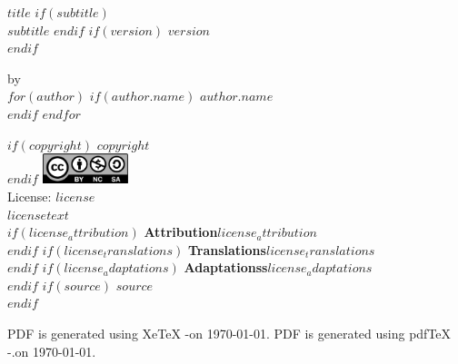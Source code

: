 \documentclass[10pt, letterpaper, titlepage, oneside, openright, final, article]{memoir}
\begin{document}
\frontmatter


%
%
\thispagestyle{empty}
\begin{flushleft}
    {\bfseries $title$}
    $if(subtitle)$
        {\\\itshape $subtitle$}
    $endif$
    $if(version)$
        \normalsize $version$\\
    $endif$
    \vspace*{1em}

    \normalsize by\\
    $for(author)$
        $if(author.name)$
            \normalsize $author.name$\\
        $endif$
    $endfor$

    \vspace*{1.5em}

    $if(copyright)$
        \normalsize $copyright$\\[1.2em]
    $endif$
    \includegraphics[keepaspectratio=true, width=2.5cm]{cc_by_nc_sa_40.eps}\\[1.2em]
    \normalsize License: $license$\\[1.2em]
    \normalsize $licensetext$\\[1.2em]
    $if(license_attribution)$
        \normalsize {\bfseries Attribution}\textemdash $license_attribution$\\[1.2em]
    $endif$
    $if(license_translations)$
        \normalsize {\bfseries Translations}\textemdash $license_translations$\\[1.2em]
    $endif$
    $if(license_adaptations)$
        \normalsize {\bfseries Adaptationss}\textemdash $license_adaptations$\\[1.2em]
    $endif$
    $if(source)$
        \normalsize $source$\\[1.2em]
    $endif$

    \ifxetex
        \normalsize PDF is generated using XeTeX \the\eTeXversion\eTeXrevision-\the\XeTeXversion\XeTeXrevision\space on \today.
    \else
        \normalsize PDF is generated using pdfTeX \the\eTeXversion\eTeXrevision-\the\pdftexversion.\pdftexrevision\space on \today.
    \fi
\end{flushleft}
\pagebreak
\end{document}
